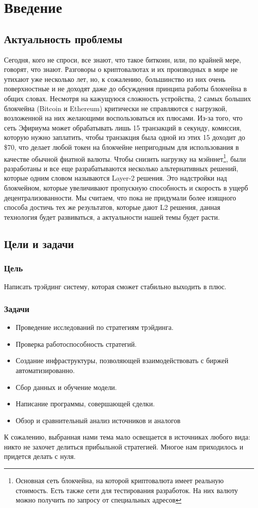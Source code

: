 \section{Введение}

\subsection{Актуальность проблемы}
Сегодня, кого не спроси, все знают, что такое биткоин, или, по крайней мере, говорят, что знают. Разговоры о криптовалютах и их производных в мире не утихают уже несколько лет, но, к сожалению, большинство из них очень поверхностные и не доходят даже до обсуждения принципа работы блокчейна в общих словах.
Несмотря на кажущуюся сложность устройства, 2 самых больших блокчейна (Bitcoin и Ethereum) критически не справляются с нагрузкой, возложенной на них желающими воспользоваться их плюсами. Из-за того, что сеть Эфириума может обрабатывать лишь 15 транзакций в секунду, комиссия, которую нужно заплатить, чтобы транзакция была одной из этих 15 доходит до \$70, что делает любой токен на блокчейне непригодным для использования в качестве обычной фиатной валюты. Чтобы снизить нагрузку на мэйннет\footnote{Основная сеть блокчейна, на которой криптовалюта имеет реальную стоимость. Есть также сети для тестирования разработок. На них валюту можно получить по запросу от специальных адресов}, были разработаны и все еще разрабатываются несколько альтернативных решений, которые одним словом называются Layer-2 решения. Это надстройки над блокчейном, которые увеличивают пропускную способность и скорость в ущерб децентрализованности.
Мы считаем, что пока не придумали более изящного способа достичь тех же результатов, которые дают L2 решения, данная технология будет развиваться, а актуальности нашей темы будет расти.

\subsection{Цели и задачи}
\subsubsection{Цель}
Написать трэйдинг систему, которая сможет стабильно выходить в плюс.
\subsubsection{Задачи}
\begin{itemize}
\item Проведение исследований по стратегиям трэйдинга.
\item Проверка работоспособность стратегий.
\item Создание инфраструктуры, позволяющей взаимодействовать с биржей автоматизированно.
\item Сбор данных и обучение модели.
\item Написание программы, совершающей сделки.
\item Обзор и сравнительный анализ источников и аналогов
\end{itemize}
К сожалению, выбранная нами тема мало освещается в источниках любого вида: никто не захочет делиться прибыльной стратегией. Многое нам приходилось и придется делать с нуля.

